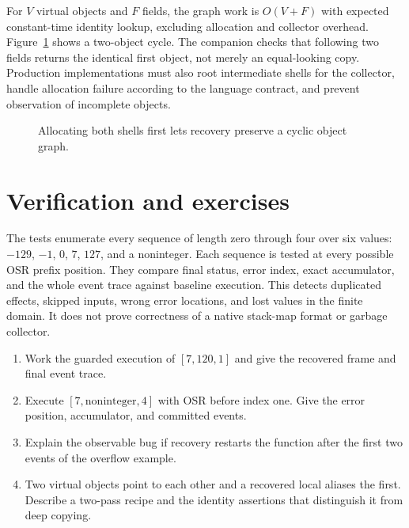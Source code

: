 For $V$ virtual objects and $F$ fields, the graph work is $O(V+F)$ with expected constant-time identity lookup, excluding allocation and collector overhead.
Figure~\ref{fig:ch66-cycle} shows a two-object cycle.
The companion checks that following two  fields returns the identical first object, not merely an equal-looking copy.
Production implementations must also root intermediate shells for the collector, handle allocation failure according to the language contract, and prevent observation of incomplete objects.

\begin{figure}[htbp]
\centering
{}
\caption{Allocating both shells first lets recovery preserve a cyclic object graph.}
\label{fig:ch66-cycle}
\end{figure}

\section{Verification and exercises}
\label{sec:ch66-exercises}

The tests enumerate every sequence of length zero through four over six values: $-129$, $-1$, $0$, $7$, $127$, and a noninteger.
Each sequence is tested at every possible OSR prefix position.
They compare final status, error index, exact accumulator, and the whole event trace against baseline execution.
This detects duplicated effects, skipped inputs, wrong error locations, and lost values in the finite domain.
It does not prove correctness of a native stack-map format or garbage collector.

\begin{enumerate}
\item\label{ex:ch66-overflow} Work the guarded execution of $[7,120,1]$ and give the recovered frame and final event trace.
\item\label{ex:ch66-error} Execute $[7,\text{noninteger},4]$ with OSR before index one.
Give the error position, accumulator, and committed events.
\item\label{ex:ch66-replay} Explain the observable bug if recovery restarts the function after the first two events of the overflow example.
\item\label{ex:ch66-identity} Two virtual objects point to each other and a recovered local aliases the first.
Describe a two-pass recipe and the identity assertions that distinguish it from deep copying.
\end{enumerate}

